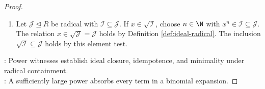 \begin{proposition}
\begin{proof}
\begin{enumerate}[label=(\roman*)]
Relation $(\exists\,n\in\N)\,x^{mn}=(x^m)^n\in\mathcal{I}$ holds by Definition \ref{def:ideal-radical}, exponent laws. Relation $x\in\operatorname{rad}(\mathcal{I})$ holds by Definition \ref{def:ideal-radical}.\\
Equality $\operatorname{rad}(\operatorname{rad}(\mathcal{I}))=\operatorname{rad}(\mathcal{I})$ holds by mutual inclusion. Ideal $\sqrt{\mathcal{I}}$ is radical by Definition \ref{def:ideal-radical}.
\item Let $\mathcal{J}\trianglelefteq R$ be radical with $\mathcal{I}\subseteq\mathcal{J}$. If $x\in\sqrt{\mathcal{I}}$, choose $n\in\N$ with $x^n\in\mathcal{I}\subseteq\mathcal{J}$.\\
The relation $x\in\sqrt{\mathcal{J}}=\mathcal{J}$ holds by Definition \ref{def:ideal-radical}. The inclusion $\sqrt{\mathcal{I}}\subseteq\mathcal{J}$ holds by this element test.
\end{enumerate}
: Power witnesses establish ideal closure, idempotence, and minimality under radical containment.\\
: A sufficiently large power absorbs every term in a binomial expansion.
\end{proof}
\end{proposition}
